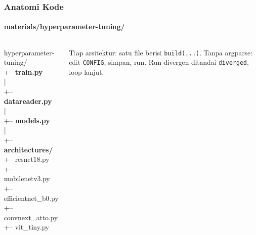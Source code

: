 \documentclass[t,aspectratio=169,xcolor={dvipsnames,table}]{beamer}
\begin{document}
\begin{frame}
    \frametitle{Anatomi Kode}
    \framesubtitle{materials/hyperparameter-tuning/}
    \footnotesize

    \begin{columns}[T]
        {\ttfamily\scriptsize
        hyperparameter-tuning/\\
        +-- \textbf{train.py}\\
        |\\
        +-- \textbf{datareader.py}\\
        |\\
        +-- \textbf{models.py}\\
        |\\
        +-- \textbf{architectures/}\\
        \hspace*{2.4em}+-- resnet18.py\\
        \hspace*{2.4em}+-- mobilenetv3.py\\
        \hspace*{2.4em}+-- efficientnet\_b0.py\\
        \hspace*{2.4em}+-- convnext\_atto.py\\
        \hspace*{2.4em}+-- vit\_tiny.py\par}
        \vspace{0.1cm}
        {\scriptsize\color{dlMute} Tiap arsitektur: satu file berisi \texttt{build(...)}. Tanpa argparse: edit \texttt{CONFIG}, simpan, run. Run divergen ditandai \texttt{diverged}, loop lanjut.}


\end{columns}
\end{frame}
\end{document}

